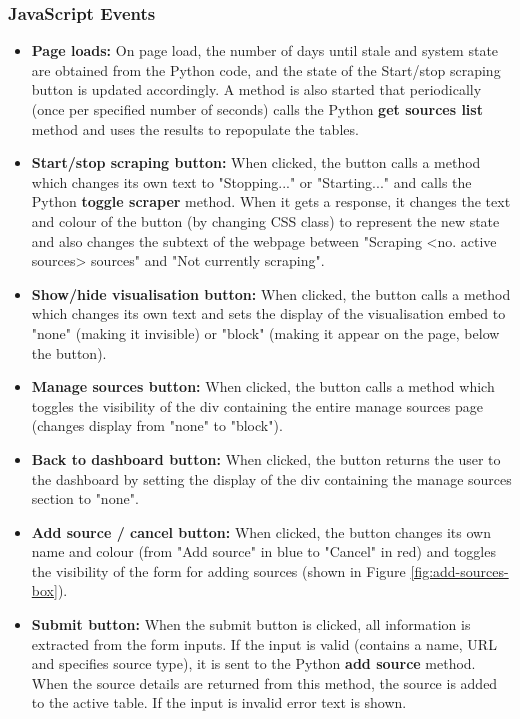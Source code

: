 \documentclass{l4proj}
\begin{document}
\subsubsection{JavaScript Events}
\begin{itemize}
    \item \textbf{Page loads: } On page load, the number of days until stale and system state are obtained from the Python code, and the state of the Start/stop scraping button is updated accordingly. A method is also started that periodically (once per specified number of seconds) calls the Python \textbf{get sources list} method and uses the results to repopulate the tables.
    \item \textbf{Start/stop scraping button:} When clicked, the button calls a method which changes its own text to "Stopping..." or "Starting..." and calls the Python \textbf{toggle scraper} method. When it gets a response, it changes the text and colour of the button (by changing CSS class) to represent the new state and also changes the subtext of the webpage between "Scraping <no. active sources> sources" and "Not currently scraping".
    \item \textbf{Show/hide visualisation button: } When clicked, the button calls a method which changes its own text and sets the display of the visualisation embed to "none" (making it invisible) or "block" (making it appear on the page, below the button).
    \item \textbf{Manage sources button: } When clicked, the button calls a method which toggles the visibility of the div containing the entire manage sources page (changes display from "none" to "block").
    \item \textbf{Back to dashboard button: } When clicked, the button returns the user to the dashboard by setting the display of the div containing the manage sources section to "none".
    \item \textbf{Add source / cancel button: } When clicked, the button changes its own name and colour (from "Add source" in blue to "Cancel" in red) and toggles the visibility of the form for adding sources (shown in Figure \ref{fig:add-sources-box}).
    \item \textbf{Submit button: } When the submit button is clicked, all information is extracted from the form inputs. If the input is valid (contains a name, URL and specifies source type), it is sent to the Python \textbf{add source} method. When the source details are returned from this method, the source is added to the active table. If the input is invalid error text is shown.

\end{itemize}
\end{document}
